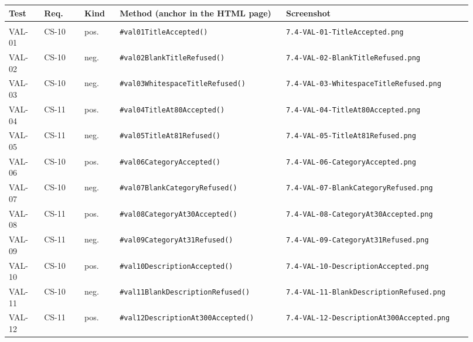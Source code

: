 \setlength{\tabcolsep}{4pt}\begin{longtable}{@{}>{\raggedright\arraybackslash}p{0.07\linewidth} >{\raggedright\arraybackslash}p{0.08\linewidth} >{\raggedright\arraybackslash}p{0.07\linewidth} >{\raggedright\arraybackslash}p{0.33\linewidth} >{\raggedright\arraybackslash}p{0.37\linewidth}@{}}
\toprule
\textbf{Test} & \textbf{Req.} & \textbf{Kind} & \textbf{Method (anchor in the HTML page)} & \textbf{Screenshot} \\
\midrule
\endhead
\multicolumn{5}{@{}l}{\sffamily\bfseries\small LessonValidationTestingAutomation.html} \\
VAL-01 & CS-10 & pos. & \scriptsize\texttt{\#val01TitleAccepted()} & \scriptsize\texttt{7.4-VAL-01-TitleAccepted.png} \\
VAL-02 & CS-10 & neg. & \scriptsize\texttt{\#val02BlankTitleRefused()} & \scriptsize\texttt{7.4-VAL-02-BlankTitleRefused.png} \\
VAL-03 & CS-10 & neg. & \scriptsize\texttt{\#val03WhitespaceTitleRefused()} & \scriptsize\texttt{7.4-VAL-03-WhitespaceTitleRefused.png} \\
VAL-04 & CS-11 & pos. & \scriptsize\texttt{\#val04TitleAt80Accepted()} & \scriptsize\texttt{7.4-VAL-04-TitleAt80Accepted.png} \\
VAL-05 & CS-11 & neg. & \scriptsize\texttt{\#val05TitleAt81Refused()} & \scriptsize\texttt{7.4-VAL-05-TitleAt81Refused.png} \\
VAL-06 & CS-10 & pos. & \scriptsize\texttt{\#val06CategoryAccepted()} & \scriptsize\texttt{7.4-VAL-06-CategoryAccepted.png} \\
VAL-07 & CS-10 & neg. & \scriptsize\texttt{\#val07BlankCategoryRefused()} & \scriptsize\texttt{7.4-VAL-07-BlankCategoryRefused.png} \\
VAL-08 & CS-11 & pos. & \scriptsize\texttt{\#val08CategoryAt30Accepted()} & \scriptsize\texttt{7.4-VAL-08-CategoryAt30Accepted.png} \\
VAL-09 & CS-11 & neg. & \scriptsize\texttt{\#val09CategoryAt31Refused()} & \scriptsize\texttt{7.4-VAL-09-CategoryAt31Refused.png} \\
VAL-10 & CS-10 & pos. & \scriptsize\texttt{\#val10DescriptionAccepted()} & \scriptsize\texttt{7.4-VAL-10-DescriptionAccepted.png} \\
VAL-11 & CS-10 & neg. & \scriptsize\texttt{\#val11BlankDescriptionRefused()} & \scriptsize\texttt{7.4-VAL-11-BlankDescriptionRefused.png} \\
VAL-12 & CS-11 & pos. & \scriptsize\texttt{\#val12DescriptionAt300Accepted()} & \scriptsize\texttt{7.4-VAL-12-DescriptionAt300Accepted.png} \\

\end{longtable}
